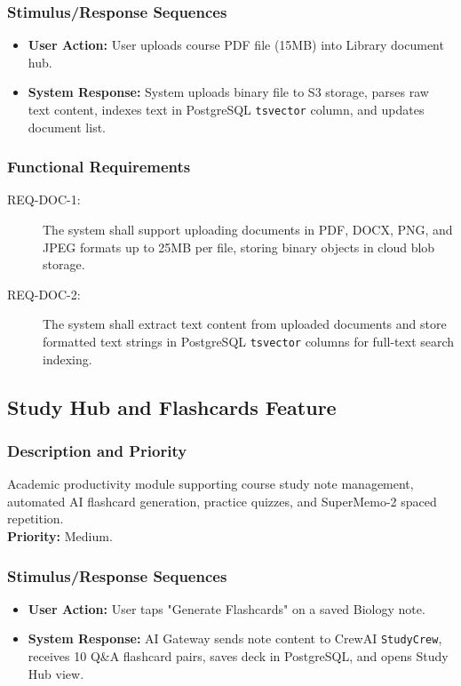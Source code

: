\documentclass[11pt,a4paper]{article}
\begin{document}
\subsubsection{Stimulus/Response Sequences}
\begin{itemize}
    \item \textbf{User Action:} User uploads course PDF file (15MB) into Library document hub.
    \item \textbf{System Response:} System uploads binary file to S3 storage, parses raw text content, indexes text in PostgreSQL \texttt{tsvector} column, and updates document list.
\end{itemize}

\subsubsection{Functional Requirements}
\begin{description}
    \item[REQ-DOC-1:] The system shall support uploading documents in PDF, DOCX, PNG, and JPEG formats up to 25MB per file, storing binary objects in cloud blob storage.
    \item[REQ-DOC-2:] The system shall extract text content from uploaded documents and store formatted text strings in PostgreSQL \texttt{tsvector} columns for full-text search indexing.
\end{description}

\subsection{Study Hub and Flashcards Feature}
\subsubsection{Description and Priority}
Academic productivity module supporting course study note management, automated AI flashcard generation, practice quizzes, and SuperMemo-2 spaced repetition. \\
\textbf{Priority:} Medium.

\subsubsection{Stimulus/Response Sequences}
\begin{itemize}
    \item \textbf{User Action:} User taps "Generate Flashcards" on a saved Biology note.
    \item \textbf{System Response:} AI Gateway sends note content to CrewAI \texttt{StudyCrew}, receives 10 Q\&A flashcard pairs, saves deck in PostgreSQL, and opens Study Hub view.
\end{itemize}
\end{document}
